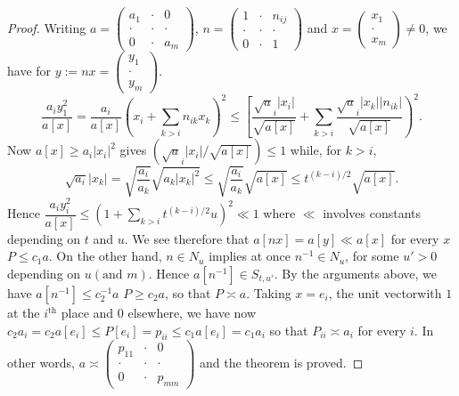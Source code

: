 \begin{proof}
Writing $a=\left(\begin{smallmatrix} a_{1} & \cdot & 0\\ \cdot & \cdot
  & \cdot\\ 0 & \cdot & a_{m}\end{smallmatrix}\right)$,
$n=\left(\begin{smallmatrix} 1 & \cdot & n_{ij}\\ \cdot & \cdot &
  \cdot\\ 0 & \cdot & 1\end{smallmatrix}\right)$ and
  $x=\left(\begin{smallmatrix} x_{1}\\ \cdot \\ x_{m}
  \end{smallmatrix}\right)\neq 0$, we have for
  $y:=nx=\left(\begin{smallmatrix} y_{1}\\ \cdot \\ y_{m}
  \end{smallmatrix}\right)$.
$$
\frac{a_{i}y^{2}_{1}}{a[x]}=\frac{a_{i}}{a[x]}\left(x_{i}+\sum_{k>i}n_{ik}x_{k}\right)^{2}\leq
\left[\frac{\sqrt{a}_{i}|x_{i}|}{\sqrt{a[x]}}+\sum_{k>i}\frac{\sqrt{a}_{i}|x_{k}||n_{ik}|}{\sqrt{a[x]}}\right)^{2}. 
$$
Now $a[x]\geq a_{i}|x_{i}|^{2}$ gives
$(\sqrt{a}_{i}|x_{i}|/\sqrt{a[x]})\leq 1$ while, for $k>i$, 
$$
\sqrt{a_{i}}|x_{k}|=\sqrt{\frac{a_{i}}{a_{k}}}\sqrt{a_{k}|x_{k}|^{2}}\leq
\sqrt{\frac{a_{i}}{a_{k}}}\sqrt{a[x]}\leq t^{(k-i)/2}\sqrt{a[x]}. 
$$
Hence $\dfrac{a_{i}y^{2}_{i}}{a[x]}\leq
\left(1+\sum_{k>i}t^{(k-i)/2}u\right)^{2}\ll 1$ where $\ll$ involves
constants depending on $t$ and $u$. We see therefore that
$a[nx]=a[y]\ll a[x]$ for every $x$ \ie $P\leq c_{1}a$. On the other
hand, $n\in N_{u}$ implies at once $n^{-1}\in N_{u}$, for some $u'>0$
depending on $u(\text{and } m)$. Hence $a[n^{-1}]\in S_{t,u'}$. By the
arguments above, we have $a[n^{-1}]\leq c^{-1}_{2}a$ \ie $P\geq
c_{2}a$, so that $P\asymp a$. Taking $x=e_{i}$, the unit
vector\pageoriginale with $1$ at the $i^{\text{th}}$ place and $0$
elsewhere, we have now $c_{2}a_{i}=c_{2}a[e_{i}]\leq
P[e_{i}]=p_{ii}\leq c_{1}a[e_{i}]=c_{1}a_{i}$ so that $P_{ii}\asymp
a_{i}$ for every $i$. In other words, $a\asymp
\left(\begin{smallmatrix} p_{11} &\cdot & 0\\ \cdot & \cdot & \cdot\\
0 & \cdot & p_{mm}\end{smallmatrix}\right)$ and the theorem is proved.
\end{proof}

